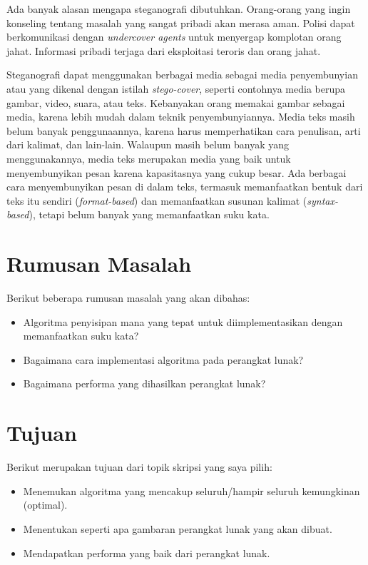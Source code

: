 Ada banyak alasan mengapa steganografi dibutuhkan. Orang-orang yang ingin konseling tentang masalah yang sangat pribadi akan merasa aman. Polisi dapat berkomunikasi dengan \textit{undercover agents} untuk menyergap komplotan orang jahat. Informasi pribadi terjaga dari eksploitasi teroris dan orang jahat.\cite{Dpcrypto:2009}

Steganografi dapat menggunakan berbagai media sebagai media penyembunyian atau yang dikenal dengan istilah \textit{stego-cover}, seperti contohnya media berupa gambar, video, suara, atau teks. Kebanyakan orang memakai gambar sebagai media, karena lebih mudah dalam teknik penyembunyiannya. Media teks masih belum banyak penggunaannya, karena harus memperhatikan cara penulisan, arti dari kalimat, dan lain-lain. Walaupun masih belum banyak yang menggunakannya, media teks merupakan media yang baik untuk menyembunyikan pesan karena kapasitasnya yang cukup besar. Ada berbagai cara menyembunyikan pesan di dalam teks, termasuk memanfaatkan bentuk dari teks itu sendiri (\textit{format-based}) dan memanfaatkan susunan kalimat (\textit{syntax-based}), tetapi belum banyak yang memanfaatkan suku kata.

\section{Rumusan Masalah}
\label{rumusanMasalah}
Berikut beberapa rumusan masalah yang akan dibahas:
\begin{itemize}
	\item Algoritma penyisipan mana yang tepat untuk diimplementasikan dengan memanfaatkan suku kata?
	\item Bagaimana cara implementasi algoritma pada perangkat lunak?
	\item Bagaimana performa yang dihasilkan perangkat lunak?
\end{itemize}

\section{Tujuan}
\label{sec:tujuan}
Berikut merupakan tujuan dari topik skripsi yang saya pilih:
\begin{itemize}
	\item Menemukan algoritma yang mencakup seluruh/hampir seluruh kemungkinan (optimal).
	\item Menentukan seperti apa gambaran perangkat lunak yang akan dibuat.
	\item Mendapatkan performa yang baik dari perangkat lunak.
\end{itemize}

